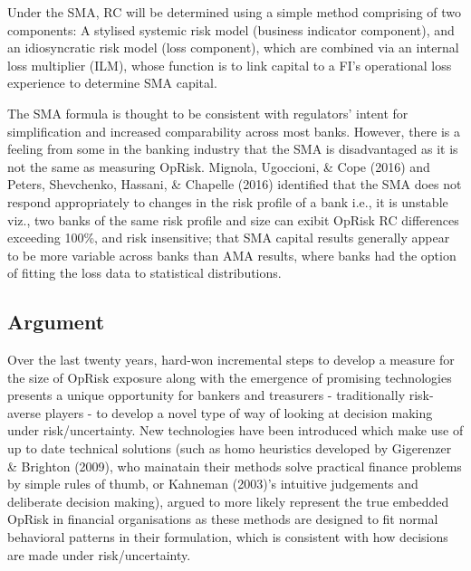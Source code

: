 \documentclass{DissertateUSU}
\begin{document}
Under the SMA, RC will be determined using a simple method comprising of
two components: A stylised systemic risk model (business indicator
component), and an idiosyncratic risk model (loss component), which are
combined via an internal loss multiplier (ILM), whose function is to
link capital to a FI's operational loss experience to determine SMA
capital.\medskip

The SMA formula is thought to be consistent with regulators' intent for
simplification and increased comparability across most banks. However,
there is a feeling from some in the banking industry that the SMA is
disadvantaged as it is not the same as measuring OpRisk. Mignola,
Ugoccioni, \& Cope (2016) and Peters, Shevchenko, Hassani, \& Chapelle
(2016) identified that the SMA does not respond appropriately to changes
in the risk profile of a bank i.e., it is unstable viz., two banks of
the same risk profile and size can exibit OpRisk RC differences
exceeding 100\%, and risk insensitive; that SMA capital results
generally appear to be more variable across banks than AMA results,
where banks had the option of fitting the loss data to statistical
distributions.

\subsection{Argument}
\label{ssec:Argument}

Over the last twenty years, hard-won incremental steps to develop a
measure for the size of OpRisk exposure along with the emergence of
promising technologies presents a unique opportunity for bankers and
treasurers - traditionally risk-averse players - to develop a novel type
of way of looking at decision making under risk/uncertainty. New
technologies have been introduced which make use of up to date technical
solutions (such as homo heuristics developed by Gigerenzer \& Brighton
(2009), who mainatain their methods solve practical finance problems by
simple rules of thumb, or Kahneman (2003)'s intuitive judgements and
deliberate decision making), argued to more likely represent the true
embedded OpRisk in financial organisations as these methods are designed
to fit normal behavioral patterns in their formulation, which is
consistent with how decisions are made under risk/uncertainty.\medskip 
\end{document}
